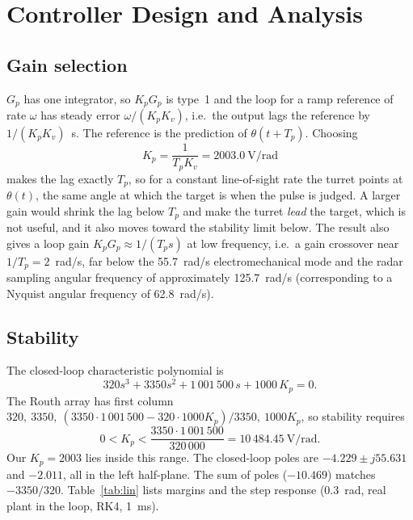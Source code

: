 \documentclass[conference]{IEEEtran}
\newcommand{\Tp}{T_p}
\newcommand{\Kp}{K_p}
\newcommand{\Kv}{K_v}
\begin{document}
\section{Controller Design and Analysis}\label{sec:ctrl}

\subsection{Gain selection}

$G_p$ has one integrator, so $\Kp G_p$ is type~1 and the loop for a ramp reference of rate $\omega$ has steady error $\omega/(\Kp\Kv)$, i.e.\ the output lags the reference by $1/(\Kp\Kv)$~s. The reference is the prediction of $\theta(t+\Tp)$. Choosing
\begin{equation}
\Kp=\frac{1}{\Tp\Kv}=2003.0\ \mathrm{V/rad}
\end{equation}
makes the lag exactly $\Tp$, so for a constant line-of-sight rate the turret points at $\theta(t)$, the same angle at which the target is when the pulse is judged. A larger gain would shrink the lag below $\Tp$ and make the turret \emph{lead} the target, which is not useful, and it also moves toward the stability limit below. The result also gives a loop gain $\Kp G_p\approx 1/(\Tp s)$ at low frequency, i.e.\ a gain crossover near $1/\Tp = 2$~rad/s, far below the 55.7~rad/s electromechanical mode and the radar sampling angular frequency of approximately
125.7~rad/s (corresponding to a Nyquist angular frequency
of 62.8~rad/s).

\subsection{Stability}

The closed-loop characteristic polynomial is
\begin{equation}
320s^3+3350s^2+1\,001\,500\,s+1000\,\Kp=0.
\end{equation}
The Routh array has first column $320,\ 3350,\ (3350\cdot1\,001\,500-320\cdot1000\Kp)/3350,\ 1000\Kp$, so stability requires
\begin{equation}
0<\Kp<\frac{3350\cdot1\,001\,500}{320\,000}=10\,484.45\ \mathrm{V/rad}.
\end{equation}
Our $\Kp=2003$ lies inside this range. The closed-loop poles are $-4.229\pm j55.631$ and $-2.011$, all in the left half-plane. The sum of poles ($-10.469$) matches $-3350/320$. Table~\ref{tab:lin} lists margins and the step response (0.3~rad, real plant in the loop, RK4, 1~ms).
\end{document}
